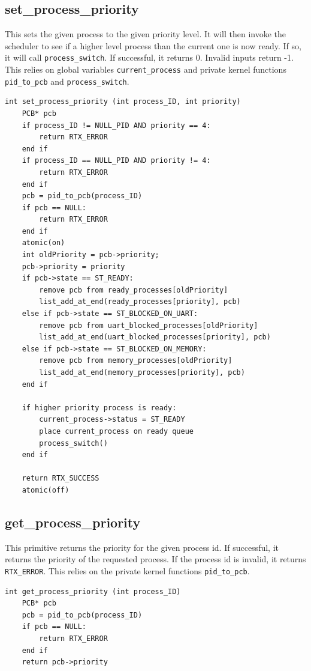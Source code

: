 \documentclass[titlepage]{article}
\begin{document}
\subsection{set\_process\_priority}
This sets the given process to the given priority level. It will then invoke the
scheduler to see if a higher level process than the current one is now ready. If
so, it will call \verb!process_switch!. If successful, it returns 0. Invalid
inputs return -1. This relies on global variables \verb!current_process! and
private kernel functions \verb!pid_to_pcb! and \verb!process_switch!.

\begin{verbatim}
int set_process_priority (int process_ID, int priority)
    PCB* pcb
    if process_ID != NULL_PID AND priority == 4:
        return RTX_ERROR
    end if
    if process_ID == NULL_PID AND priority != 4:
        return RTX_ERROR
    end if
    pcb = pid_to_pcb(process_ID)
    if pcb == NULL:
        return RTX_ERROR
    end if
    atomic(on)
    int oldPriority = pcb->priority;
    pcb->priority = priority
    if pcb->state == ST_READY:
        remove pcb from ready_processes[oldPriority]
        list_add_at_end(ready_processes[priority], pcb)
    else if pcb->state == ST_BLOCKED_ON_UART:
        remove pcb from uart_blocked_processes[oldPriority]
        list_add_at_end(uart_blocked_processes[priority], pcb)
    else if pcb->state == ST_BLOCKED_ON_MEMORY:
        remove pcb from memory_processes[oldPriority]
        list_add_at_end(memory_processes[priority], pcb)
    end if

    if higher priority process is ready:
        current_process->status = ST_READY
        place current_process on ready queue
        process_switch()
    end if

    return RTX_SUCCESS
    atomic(off)
\end{verbatim}

\subsection{get\_process\_priority}
This primitive returns the priority for the given process id. If successful, it
returns the priority of the requested process. If the process id is invalid, it
returns \verb!RTX_ERROR!. This relies on the private kernel functions
\verb!pid_to_pcb!.

\begin{verbatim}
int get_process_priority (int process_ID)
    PCB* pcb
    pcb = pid_to_pcb(process_ID)
    if pcb == NULL:
        return RTX_ERROR
    end if
    return pcb->priority
\end{verbatim}
\end{document}
